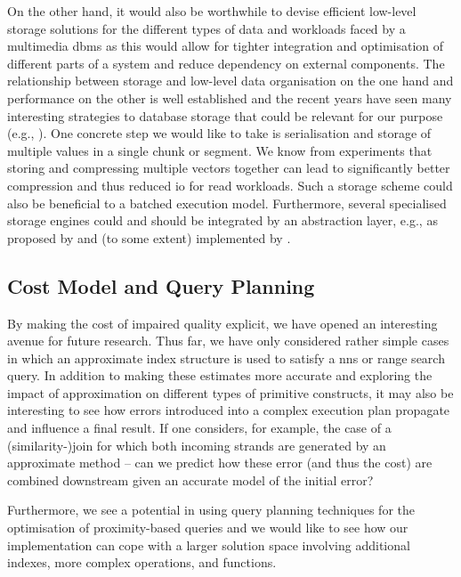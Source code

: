 On the other hand, it would also be worthwhile to devise efficient low-level storage solutions for the different types of data and workloads faced by a multimedia \acrshort{dbms} as this would allow for tighter integration and optimisation of different parts of a system and reduce dependency on external components. The relationship between storage and low-level data organisation on the one hand and performance on the other is well established \cite{Lejsek:2009NVTree,Lejsek:2011NVTree,Hojsgaard:2019Index} and the recent years have seen many interesting strategies to database storage that could be relevant for our purpose (e.g., \cite{Idreos:2012MonetDB,Sears:2012Blsm}). One concrete step we would like to take is serialisation and storage of multiple values in a single chunk or segment. We know from experiments that storing and compressing multiple vectors together can lead to significantly better compression and thus reduced \acrshort{io} for read workloads. Such a storage scheme could also be beneficial to a batched execution model. Furthermore, several specialised storage engines could and should be integrated by an abstraction layer, e.g., as proposed by \cite{Dittrich:2011Towards,Alagiannis:2014H2O} and (to some extent) implemented by \cottontail.

\subsection{Cost Model and Query Planning}
By making the cost of impaired quality explicit, we have opened an interesting avenue for future research. Thus far, we have only considered rather simple cases in which an approximate index structure is used to satisfy a \acrshort{nns} or range search query. In addition to making these estimates more accurate and exploring the impact of approximation on different types of primitive constructs, it may also be interesting to see how errors introduced into a complex execution plan propagate and influence a final result. If one considers, for example, the case of a (similarity-)join for which both incoming strands are generated by an approximate method -- can we predict how these error (and thus the cost) are combined downstream given an accurate model of the initial error?

Furthermore, we see a potential in using query planning techniques for the optimisation of proximity-based queries and we would like to see how our implementation can cope with a larger solution space involving additional indexes, more complex operations, and functions.

